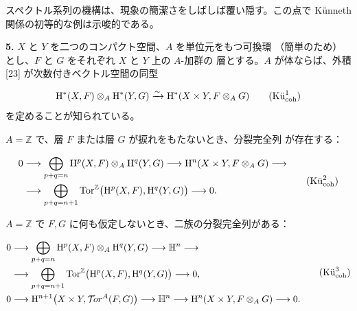 \clearpage
{}
スペクトル系列の機構は、現象の簡潔さをしばしば覆い隠す。この点で
Künneth 関係の初等的な例は示唆的である。

\noindent\textbf{5.}\quad
$X$ と $Y$ を二つのコンパクト空間、$A$ を単位元をもつ可換環
（簡単のため）とし、$F$ と $G$ をそれぞれ $X$ と $Y$ 上の $A$-加群の
層とする。$A$ が体ならば、外積 [23] が次数付きベクトル空間の同型

\begin{equation}
\mathrm H^*(X,F)\otimes_A\mathrm H^*(Y,G)
\xrightarrow{\sim}
\mathrm H^*(X\times Y,F\otimes_A G)
\tag{$\text{Kü}_{\mathrm{coh}}^{1}$}
\end{equation}
を定めることが知られている。

$A=\mathbb Z$ で、層 $F$ または層 $G$ が捩れをもたないとき、分裂完全列
が存在する：

\begin{equation}
\begin{aligned}
0 &\longrightarrow
\bigoplus_{p+q=n}\mathrm H^p(X,F)\otimes_A\mathrm H^q(Y,G)
\longrightarrow \mathrm H^n(X\times Y,F\otimes_A G) \longrightarrow \\
&\longrightarrow
\bigoplus_{p+q=n+1}
\operatorname{Tor}^{\mathbb Z}\bigl(\mathrm H^p(X,F),\mathrm H^q(Y,G)\bigr)
\longrightarrow 0.
\end{aligned}
\tag{$\text{Kü}_{\mathrm{coh}}^{2}$}
\end{equation}

$A=\mathbb Z$ で $F,G$ に何も仮定しないとき、二族の分裂完全列がある：

\begin{equation}
\begin{aligned}
0 &\longrightarrow
\bigoplus_{p+q=n}\mathrm H^p(X,F)\otimes_A\mathrm H^q(Y,G)
\longrightarrow \mathbb H^n \longrightarrow \\
&\longrightarrow
\bigoplus_{p+q=n+1}
\operatorname{Tor}^{\mathbb Z}\bigl(\mathrm H^p(X,F),\mathrm H^q(Y,G)\bigr)
\longrightarrow 0, \\
0 &\longrightarrow
\mathrm H^{n+1}\bigl(X\times Y,\mathcal T\!or^A(F,G)\bigr)
\longrightarrow \mathbb H^n
\longrightarrow \mathrm H^n(X\times Y,F\otimes_A G)
\longrightarrow 0.
\end{aligned}
\tag{$\text{Kü}_{\mathrm{coh}}^{3}$}
\end{equation}

